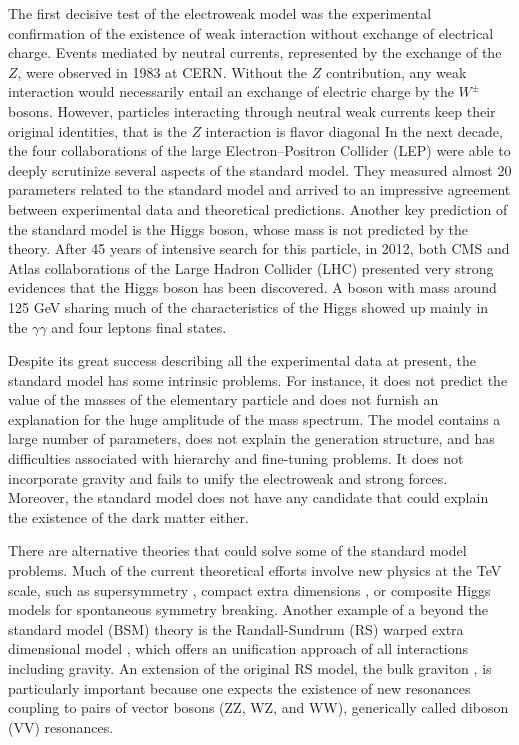 The first decisive test of the electroweak model was the experimental confirmation of the existence of weak interaction without exchange of electrical charge. Events mediated by neutral currents, represented by the exchange of the $Z$, were observed in 1983 \cite{Bagnaia:1983zx} at CERN. Without the $Z$ contribution, any weak interaction would necessarily entail an exchange of electric charge by the $W^{\pm}$ bosons. However, particles interacting through neutral weak currents keep their original identities, that is the $Z$ interaction is flavor diagonal In the next decade, the four collaborations of the large Electron--Positron Collider (LEP) were able to deeply scrutinize several aspects of the standard model. They measured almost 20 parameters related to the standard model and arrived to an impressive agreement between experimental data and theoretical predictions. Another key prediction of the standard model is the Higgs boson, whose mass is not predicted by the theory. After 45 years of intensive search for this particle, in 2012, both CMS \cite{Chatrchyan:2012xdj} and Atlas \cite{Aad:2012tfa} collaborations of the Large Hadron Collider (LHC) presented very strong evidences that the Higgs boson has been discovered. A boson with mass around 125 GeV sharing much of the characteristics of the Higgs showed up mainly in the $\gamma\gamma$ and four leptons final states.
 
Despite its great success describing all the experimental data at present, the standard model has some intrinsic problems. For instance, it does not predict the value of the masses of the elementary particle and does not furnish an explanation for the huge amplitude of the mass spectrum. The model contains a large number of parameters, does not explain the generation structure, and has difficulties associated with hierarchy and fine-tuning problems. It does not incorporate gravity and fails to unify the electroweak and strong forces. Moreover, the standard model does not have any candidate that could explain the existence of the dark matter either.

There are alternative theories that could solve some of the standard model problems. Much of the current theoretical efforts involve new physics at the TeV scale, such as supersymmetry \cite{Martin:1997ns}, compact extra dimensions \cite{Csaki:2004ay}, or composite Higgs models \cite{Agashe:2004rs} for spontaneous symmetry breaking. Another example of a beyond the standard model (BSM) theory is the Randall-Sundrum (RS) warped extra dimensional model \cite{Randall:1999ee,Randall:1999vf}, which offers an unification approach of all interactions including gravity. An extension of the original RS model, the bulk graviton \cite{Agashe:2007zd}, is particularly important because one expects the existence of new resonances coupling to pairs of vector bosons (ZZ, WZ, and WW), generically called diboson (VV) resonances.

